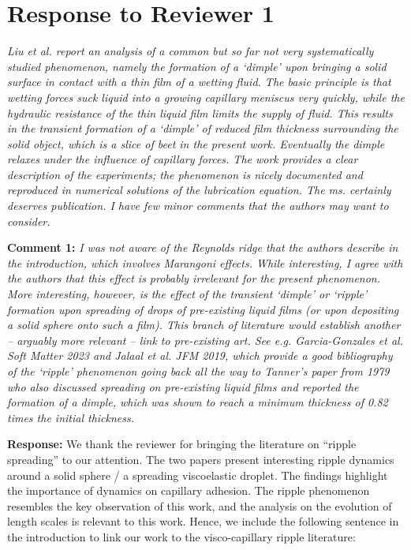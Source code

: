 \documentclass[11pt]{article}
\begin{document}
\section*{Response to Reviewer 1}

\begin{siderules}
\textit{Liu et al. report an analysis of a common but so far not very systematically studied phenomenon, namely the formation of a ‘dimple’ upon bringing a solid surface in contact with a thin film of a wetting fluid. The basic principle is that wetting forces suck liquid into a growing capillary meniscus very quickly, while the hydraulic resistance of the thin liquid film limits the supply of fluid. This results in the transient formation of a ‘dimple’ of reduced film thickness surrounding the solid object, which is a slice of beet in the present work. Eventually the dimple relaxes under the influence of capillary forces. The work provides a clear description of the experiments; the phenomenon is nicely documented and reproduced in numerical solutions of the lubrication equation. The ms. certainly deserves publication. I have few minor comments that the authors may want to consider. }
\end{siderules}

\begin{siderules}
\textbf{Comment 1:} \textit{I was not aware of the Reynolds ridge that the authors describe in the introduction, which involves Marangoni effects. While interesting, I agree with the authors that this effect is probably irrelevant for the present phenomenon. More interesting, however, is the effect of the transient ‘dimple’ or ‘ripple’ formation upon spreading of drops of pre-existing liquid films (or upon depositing a solid sphere onto such a film). This branch of literature would establish another – arguably more relevant – link to pre-existing art. See e.g. Garcia-Gonzales et al. Soft Matter 2023 and Jalaal et al. JFM 2019, which provide a good bibliography of the ‘ripple’ phenomenon going back all the way to Tanner’s paper from 1979 who also discussed spreading on pre-existing liquid films and reported the formation of a dimple, which was shown to reach a minimum thickness of 0.82 times the initial thickness.}
\end{siderules}

\textbf{Response:} We thank the reviewer for bringing the literature on ``ripple spreading'' to our attention. The two papers present interesting ripple dynamics around a solid sphere / a spreading viscoelastic droplet. The findings highlight the importance of dynamics on capillary adhesion. The ripple phenomenon resembles the key observation of this work, and the analysis on the evolution of length scales is relevant to this work. Hence, we include the following sentence in the introduction to link our work to the visco-capillary ripple literature:
\end{document}
